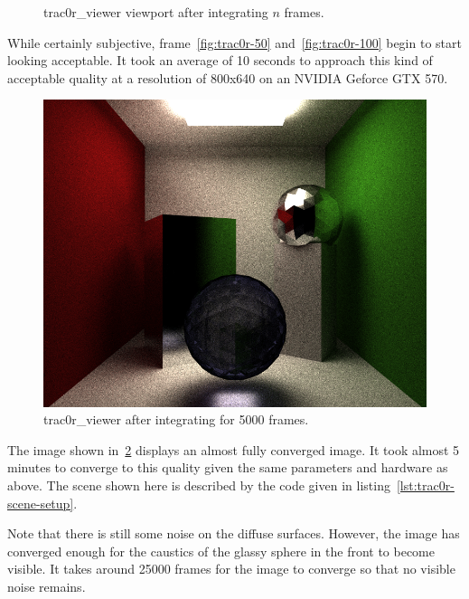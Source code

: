 \documentclass[
  twoside,
  11pt, a4paper,
  footinclude=true,
  headinclude=true,
  cleardoublepage=empty
]{scrreprt}
\begin{document}
\begin{figure}[H]
    \centering
    \caption{trac0r\_viewer viewport after integrating \(n\) frames.}
    \label{fig:trac0r_n_frames}
\end{figure}

While certainly subjective, frame~\ref{fig:trac0r-50} and~\ref{fig:trac0r-100} begin to start looking
acceptable. It took an average of 10 seconds to approach this kind of acceptable quality at a
resolution of 800x640 on an NVIDIA Geforce GTX 570.

\begin{figure}[H]
    \includegraphics[scale=0.5]{trac0r-5000.png}
    \centering
    \caption{trac0r\_viewer after integrating for 5000 frames.}
    \label{fig:trac0r-5000}
\end{figure}

The image shown in~\ref{fig:trac0r-5000} displays an almost fully converged image. It took almost 5
minutes to converge to this quality given the same parameters and hardware as above. The scene
shown here is described by the code given in listing~\ref{lst:trac0r-scene-setup}.

Note that there is still some noise on the diffuse surfaces. However, the image has converged
enough for the caustics of the glassy sphere in the front to become visible. It takes around 25000
frames for the image to converge so that no visible noise remains.
\end{document}
